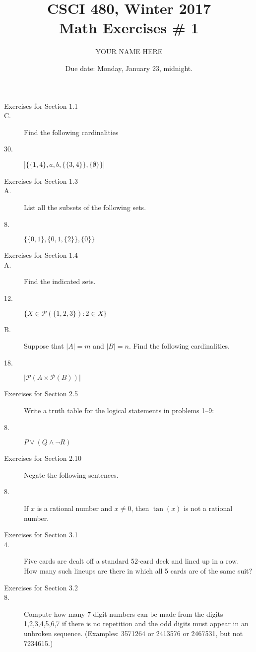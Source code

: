 \documentclass{article}
\title{CSCI 480, Winter 2017\\Math Exercises \# 1}
\author{YOUR NAME HERE}
\date{Due date:  Monday, January 23, midnight.}
\begin{document}
\maketitle

\begin{description}
\item[Exercises for Section 1.1]
\item[C.] Find the following cardinalities
\item[30.] $|\{\{1,4\},a,b,\{\{3,4\}\},\{\emptyset\}\}|$

\item[Exercises for Section 1.3]
\item[A.] List all the subsets of the following sets.
\item[8.] $\{\{0,1\},\{0,1,\{2\}\},\{0\}\}$

\item[Exercises for Section 1.4]
\item[A.] Find the indicated sets.
\item[12.] $\{X\in\mathcal{P}(\{1,2,3\}):2\in X\}$
\item[B.] Suppose that $|A|=m$ and $|B|=n$.  Find the following cardinalities.
\item[18.] $|\mathcal{P}(A\times \mathcal{P}(B))|$


\item[Exercises for Section 2.5] Write a truth table for the logical
  statements in problems 1--9:

\item[8.] $P \vee (Q \wedge \neg R)$

\item[Exercises for Section 2.10]  Negate the following sentences.


\item[8.] If $x$ is a rational number and $x\not = 0$, then
  $\tan(x)$ is not a rational number.
  

\item[Exercises for Section 3.1]

\item[4.]  Five cards are dealt off a standard 52-card deck and
  lined up in a row.  How many such lineups are there in
  which all 5 cards are of the same suit?

\item[Exercises for Section 3.2]

\item[8.] Compute how many 7-digit numbers can be made from the digits
  1,2,3,4,5,6,7 if there is no repetition and the odd digits
  must appear in an unbroken sequence.  (Examples: 3571264 or 2413576 or
  2467531, but not 7234615.)


\end{description}
\end{document}
